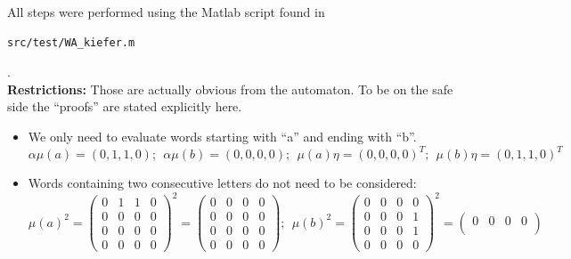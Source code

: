                
            All steps were performed using the Matlab script found in \begin{verbatim}src/test/WA_kiefer.m\end{verbatim}. \\
            
            \textbf{Restrictions:} Those are actually obvious from the automaton. To be on the safe side the ``proofs'' are stated explicitly here.
            \begin{itemize}
                \item We only need to evaluate words starting with ``a'' and ending with ``b''.
                    \[ \alpha \mu(a) = (0,1,1,0); \ \ \alpha \mu(b) = (0,0,0,0); \ \ \mu(a) \eta = (0,0,0,0)^T; \ \ \mu(b) \eta = (0, 1, 1, 0)^T \]
                \item Words containing two consecutive letters do not need to be considered:
                    \[  \mu(a)^2 = \begin{pmatrix}
                                        0 & 1 & 1 & 0 \\
                                        0 & 0 & 0 & 0 \\
                                        0 & 0 & 0 & 0 \\
                                        0 & 0 & 0 & 0
                                    \end{pmatrix}^2 = \begin{pmatrix}
                                        0 & 0 & 0 & 0 \\
                                        0 & 0 & 0 & 0 \\
                                        0 & 0 & 0 & 0 \\
                                        0 & 0 & 0 & 0
                                    \end{pmatrix};  \ \ \mu(b)^2 = \begin{pmatrix}
                                        0 & 0 & 0 & 0 \\
                                        0 & 0 & 0 & 1 \\
                                        0 & 0 & 0 & 1 \\
                                        0 & 0 & 0 & 0
                                    \end{pmatrix}^2 = \begin{pmatrix}
                                        0 & 0 & 0 & 0 \\

\end{pmatrix}\]
\end{itemize}
